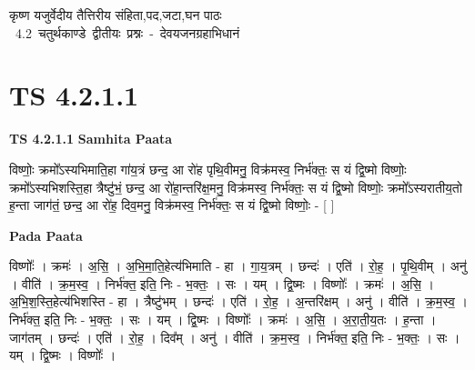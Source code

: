 \documentclass[17pt]{extarticle}
\begin{document}
\begin{titlepage}
    \begin{center}
 
\begin{sanskrit}
    { \Large
    कृष्ण यजुर्वेदीय तैत्तिरीय संहिता,पद,जटा,घन पाठः 
    }
    \\
    \vspace{2.5cm}
    \mbox{ \Large
    4.2      चतुर्थकाण्डे द्वीतीयः प्रश्नः - देवयजनग्रहाभिधानं   }
\end{sanskrit}
\end{center}

\end{titlepage}
\tableofcontents
{}
\pagebreak


\section{ TS 4.2.1.1 }

\textbf{TS 4.2.1.1 } \newline
\textbf{Samhita Paata} \newline

विष्णोः॒ क्रमो᳚ऽस्यभिमाति॒हा गा॑य॒त्रं छन्द॒ आ रो॑ह पृथि॒वीमनु॒ विक्र॑मस्व॒ निर्भ॑क्तः॒ स यं द्वि॒ष्मो विष्णोः॒ क्रमो᳚ऽस्यभिशस्ति॒हा त्रैष्टु॑भं॒ छन्द॒ आ रो॑हा॒न्तरि॑क्ष॒मनु॒ विक्र॑मस्व॒ निर्भ॑क्तः॒ स यं द्वि॒ष्मो विष्णोः॒ क्रमो᳚ऽस्यरातीय॒तो ह॒न्ता जाग॑तं॒ छन्द॒ आ रो॑ह॒ दिव॒मनु॒ विक्र॑मस्व॒ निर्भ॑क्तः॒ स यं द्वि॒ष्मो विष्णोः॒ - [  ] \newline

\textbf{Pada Paata} \newline

विष्णोः᳚ । क्रमः॑ । अ॒सि॒ । अ॒भि॒मा॒ति॒हेत्य॑भिमाति - हा । गा॒य॒त्रम् । छन्दः॑ । एति॑ । रो॒ह॒ । पृ॒थि॒वीम् । अनु॑ । वीति॑ । क्र॒म॒स्व॒ । निर्भ॑क्त॒ इति॒ निः - भ॒क्तः॒ । सः । यम् । द्वि॒ष्मः । विष्णोः᳚ । क्रमः॑ । अ॒सि॒ । अ॒भि॒श॒स्ति॒हेत्य॑भिशस्ति - हा । त्रैष्टु॑भम् । छन्दः॑ । एति॑ । रो॒ह॒ । अ॒न्तरि॑क्षम् । अनु॑ । वीति॑ । क्र॒म॒स्व॒ । निर्भ॑क्त॒ इति॒ निः - भ॒क्तः॒ । सः । यम् । द्वि॒ष्मः । विष्णोः᳚ । क्रमः॑ । अ॒सि॒ । अ॒रा॒ती॒य॒तः । ह॒न्ता । जाग॑तम् । छन्दः॑ । एति॑ । रो॒ह॒ । दिव᳚म् । अनु॑ । वीति॑ । क्र॒म॒स्व॒ । निर्भ॑क्त॒ इति॒ निः - भ॒क्तः॒ । सः । यम् । द्वि॒ष्मः । विष्णोः᳚ ।  \newline




\end{document}
